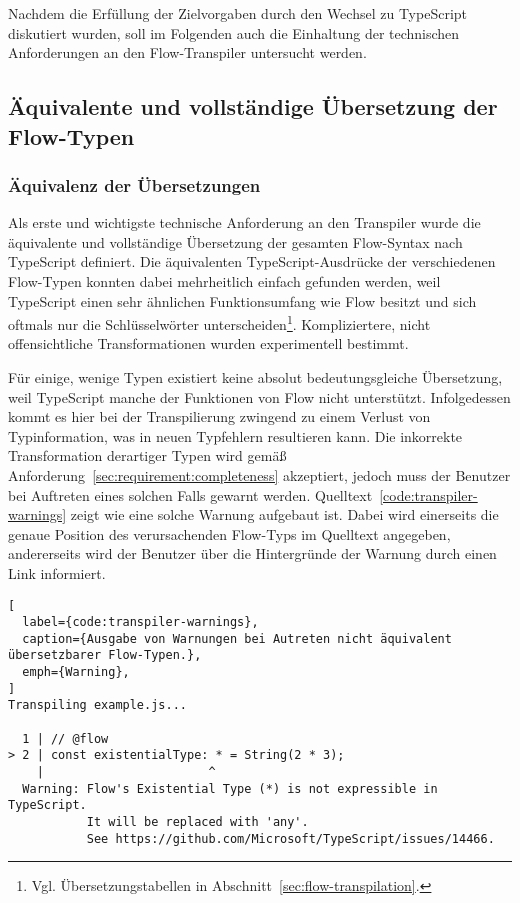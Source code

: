 Nachdem die Erfüllung der Zielvorgaben durch den Wechsel zu TypeScript diskutiert wurden, soll im Folgenden auch die Einhaltung der technischen Anforderungen an den Flow-Transpiler untersucht werden.

\subsection{Äquivalente und vollständige Übersetzung der Flow-Typen}
\label{sec:interpretation:equivalent-translation}

\subsubsection{Äquivalenz der Übersetzungen}

Als erste und wichtigste technische Anforderung an den Transpiler wurde die äquivalente und vollständige Übersetzung der gesamten Flow-Syntax nach TypeScript definiert. Die äquivalenten TypeScript-Ausdrücke der verschiedenen Flow-Typen konnten dabei mehrheitlich einfach gefunden werden, weil TypeScript einen sehr ähnlichen Funktionsumfang wie Flow besitzt und sich oftmals nur die Schlüsselwörter unterscheiden\footnote{Vgl. Übersetzungstabellen in Abschnitt~\ref{sec:flow-transpilation}.}. Kompliziertere, nicht offensichtliche Transformationen wurden experimentell bestimmt.

Für einige, wenige Typen existiert keine absolut bedeutungsgleiche Übersetzung, weil TypeScript manche der Funktionen von Flow nicht unterstützt. Infolgedessen kommt es hier bei der Transpilierung zwingend zu einem Verlust von Typinformation, was in neuen Typfehlern resultieren kann. Die inkorrekte Transformation derartiger Typen wird gemäß Anforderung~\ref{sec:requirement:completeness} akzeptiert, jedoch muss der Benutzer bei Auftreten eines solchen Falls gewarnt werden. Quelltext~\ref{code:transpiler-warnings} zeigt wie eine solche Warnung aufgebaut ist. Dabei wird einerseits die genaue Position des verursachenden Flow-Typs im Quelltext angegeben, andererseits wird der Benutzer über die Hintergründe der Warnung durch einen Link informiert.

\begin{lstlisting}[
  label={code:transpiler-warnings},
  caption={Ausgabe von Warnungen bei Autreten nicht äquivalent übersetzbarer Flow-Typen.},
  emph={Warning},
]
Transpiling example.js...

  1 | // @flow
> 2 | const existentialType: * = String(2 * 3);
    |                       ^
  Warning: Flow's Existential Type (*) is not expressible in TypeScript.
           It will be replaced with 'any'.
           See https://github.com/Microsoft/TypeScript/issues/14466.
\end{lstlisting}

